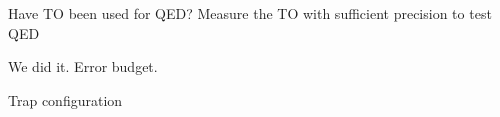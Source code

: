 

Have TO been used for QED?
Measure the TO with sufficient precision to test QED




We did it.
Error budget.



Trap configuration

